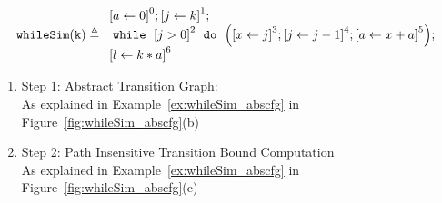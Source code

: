 \begin{example}
  \label{ex:whileSigle}
  $$
  \kw{whileSim(k)} \triangleq
    \begin{array}{l}
        \clabel{ \assign{a}{0}}^{0} ;   
              \clabel{\assign{j}{k} }^{1} ;\\
              \ewhile ~ \clabel{j > 0}^{2} ~ \edo ~ 
              \Big(
               \clabel{\assign{x}{j} }^{3}  ;
               \clabel{\assign{j}{j-1}}^{4} ;
              \clabel{\assign{a}{x + a}}^{5}  \Big);\\
              \clabel{\assign{l}{k * a} }^{6}
          \end{array}
  $$
  \begin{enumerate}
    \item Step 1: Abstract Transition Graph:
    \\
    As explained in Example~\ref{ex:whileSim_abscfg} in Figure~\ref{fig:whileSim_abscfg}(b)
  
  \item Step 2: Path Insensitive Transition Bound Computation
  \\
  As explained in Example~\ref{ex:whileSim_abscfg} in Figure~\ref{fig:whileSim_abscfg}(c)


\end{enumerate}
\end{example}
